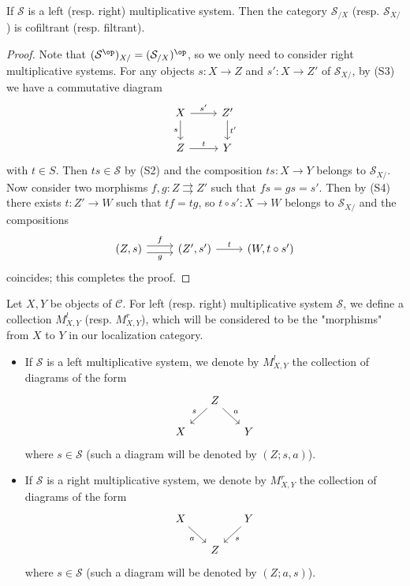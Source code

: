\begin{proposition}\label{category localization comma is filtered}
If $\mathcal{S}$ is a left (resp. right) multiplicative system. Then the category $\mathcal{S}_{/X}$ (resp. $\mathcal{S}_{X/}$) is cofiltrant (resp. filtrant).
\end{proposition}
\begin{proof}
Note that $(\mathcal{S}^{\op})_{X/}=(\mathcal{S}_{/X})^{\op}$, so we only need to consider right multiplicative systems. For any objects $s:X\to Z$ and $s':X\to Z'$ of $\mathcal{S}_{X/}$, by (S3) we have a commutative diagram
\[\begin{tikzcd}
X\ar[r,"s'"]\ar[d,swap,"s"]&Z'\ar[d,"t'"]\\
Z\ar[r,"t"]&Y
\end{tikzcd}\]
with $t\in S$. Then $ts\in\mathcal{S}$ by (S2) and the composition $ts:X\to Y$ belongs to $\mathcal{S}_{X/}$. Now consider two morphisms $f,g:Z\rightrightarrows Z'$ such that $fs=gs=s'$. Then by (S4) there exists $t:Z'\to W$ such that $tf=tg$, so $t\circ s':X\to W$ belongs to $\mathcal{S}_{X/}$ and the compositions
\[\begin{tikzcd}
(Z,s)\ar[r,shift left=3pt,"f"]\ar[r,shift right=3pt,swap,"g"]&(Z',s')\ar[r,"t"]&(W,t\circ s')
\end{tikzcd}\]
coincides; this completes the proof.
\end{proof}

Let $X,Y$ be objects of $\mathcal{C}$. For left (resp. right) multiplicative system $\mathcal{S}$, we define a collection $M_{X,Y}^l$ (resp. $M_{X,Y}^r$), which will be considered to be the "morphisms" from $X$ to $Y$ in our localization category.
\begin{itemize}
    \item If $\mathcal{S}$ is a left multiplicative system, we denote by $M_{X,Y}^l$ the collection of diagrams of the form
    \[\begin{tikzcd}[row sep=5mm, column sep=5mm]
    &Z\ar[ld,swap,"s"]\ar[rd,"a"]\\
    X&&Y
    \end{tikzcd}\]
    where $s\in\mathcal{S}$ (such a diagram will be denoted by $(Z;s,a)$).
    \item If $\mathcal{S}$ is a right multiplicative system, we denote by $M_{X,Y}^r$ the collection of diagrams of the form
    \[\begin{tikzcd}[row sep=5mm, column sep=5mm]
    X\ar[rd,swap,"a"]&&Y\ar[ld,"s"]\\
    &Z
    \end{tikzcd}\]
    where $s\in\mathcal{S}$ (such a diagram will be denoted by $(Z;a,s)$).
\end{itemize} 

